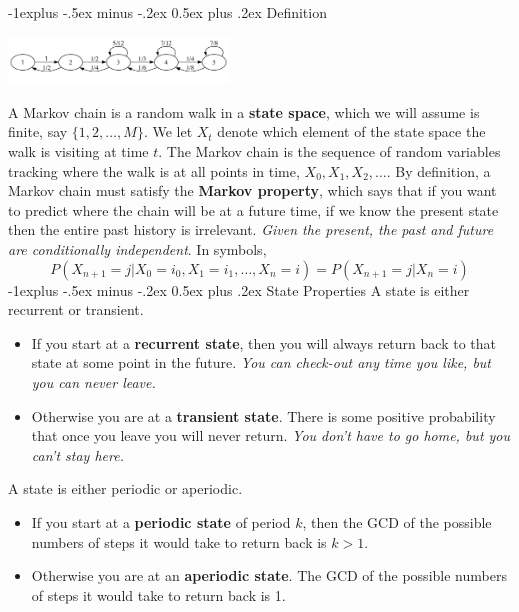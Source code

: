 \documentclass[6pt,landscape]{article}
\makeatletter
\renewcommand{\subsection}{\@startsection{subsection}{2}{0mm}%
                                {-1explus -.5ex minus -.2ex}%
                                {0.5ex plus .2ex}%
                                {\normalfont\normalsize\bfseries}}
\makeatother
\begin{document}
\begin{multicols*}{3}
\subsection{Definition}
\begin{minipage}{\linewidth}
            \centering
\includegraphics[width=2.3in]{figures/chainA.pdf}
        \end{minipage}
A Markov chain is a random walk in a \textbf{state space}, which we will assume is finite, say $\{1, 2, \dots, M\}$. We let $X_t$ denote which element of the state space the walk is visiting at time $t$. The Markov chain is the sequence of random variables tracking where the walk is at all points in time, $X_0, X_1, X_2, \dots$. By definition, a Markov chain must satisfy the \textbf{Markov property}, which says that if you want to predict where the chain will be at a future time, if we know the present state then the entire past history is irrelevant.  \emph{Given the present, the past and future are conditionally independent}. In symbols,
\[P(X_{n+1} = j | X_0 = i_0, X_1 = i_1, \dots, X_n = i) = P(X_{n+1} = j | X_n = i)\]
\subsection{State Properties}
A state is either recurrent or transient.
\begin{itemize}
\item If you start at a \textbf{recurrent state}, then you will always return back to that state at some point in the future.  \textmusicalnote \emph{You can check-out any time you like, but you can never leave.}  \textmusicalnote
\item Otherwise you are at a \textbf{transient state}. There is some positive probability that once you leave you will never return. \textmusicalnote \emph{You don't have to go home, but you can't stay here.} \textmusicalnote
\end{itemize}
A state is either periodic or aperiodic.
\begin{itemize}
\item If you start at a \textbf{periodic state} of period $k$, then the GCD of  the possible numbers of steps it would take to return back is  $k>1$.
\item Otherwise you are at an \textbf{aperiodic state}. The GCD of  the possible numbers of steps it would take to return back is 1.
\end{itemize}



\end{multicols*}
\end{document}
